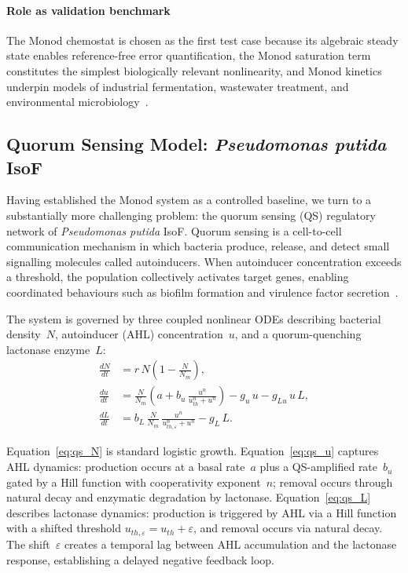 \documentclass[14pt,a4paper,openany]{extbook}
\begin{document}
\paragraph{Role as validation benchmark}
The Monod chemostat is chosen as the first test case because its algebraic
steady state enables reference-free error quantification, the Monod
saturation term constitutes the simplest biologically relevant
nonlinearity, and Monod kinetics underpin models of industrial
fermentation, wastewater treatment, and environmental
microbiology~\cite{smith2008monotone}.

\subsection{Quorum Sensing Model: \textit{Pseudomonas putida} IsoF}
\label{subsec:qs_model}

Having established the Monod system as a controlled baseline, we turn to a
substantially more challenging problem: the quorum sensing (QS) regulatory
network of \textit{Pseudomonas putida} IsoF.  Quorum sensing is a
cell-to-cell communication mechanism in which bacteria produce, release, and
detect small signalling molecules called autoinducers.  When autoinducer
concentration exceeds a threshold, the population collectively activates
target genes, enabling coordinated behaviours such as biofilm formation and
virulence factor secretion~\cite{grandclement2016quorum}.

The system is governed by three coupled nonlinear ODEs describing bacterial
density~$N$, autoinducer (AHL) concentration~$u$, and a quorum-quenching
lactonase enzyme~$L$:
%
\begin{align}
\label{eq:qs_N}
\frac{dN}{dt} &= r\,N\!\left(1 - \frac{N}{N_m}\right), \\[6pt]
\label{eq:qs_u}
\frac{du}{dt} &= \frac{N}{N_m}\!\left(a + b_u\,
    \frac{u^n}{u_{th}^n + u^n}\right)
    - g_u\, u - g_{Lu}\, u\, L, \\[6pt]
\label{eq:qs_L}
\frac{dL}{dt} &= b_L\,\frac{N}{N_m}\,
    \frac{u^n}{u_{th,\varepsilon}^n + u^n} - g_L\, L.
\end{align}

Equation~\eqref{eq:qs_N} is standard logistic growth.
Equation~\eqref{eq:qs_u} captures AHL dynamics: production occurs at a
basal rate~$a$ plus a QS-amplified rate~$b_u$ gated by a Hill function
with cooperativity exponent~$n$; removal occurs through natural decay and
enzymatic degradation by lactonase.
Equation~\eqref{eq:qs_L} describes lactonase dynamics: production is
triggered by AHL via a Hill function with a shifted threshold
$u_{th,\varepsilon} = u_{th} + \varepsilon$, and removal occurs via
natural decay.  The shift~$\varepsilon$ creates a temporal lag between AHL
accumulation and the lactonase response, establishing a delayed negative
feedback loop.
\end{document}
